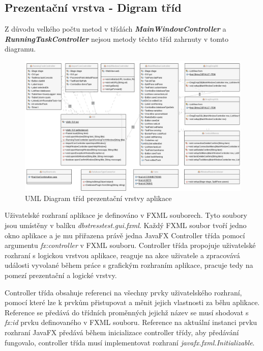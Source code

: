 \documentclass[czech,bachelor,public,dept460,male,cpdeclaration,twoside]{diploma}
\begin{document}
\newpage
\subsection{Prezentační vrstva - Digram tříd} \label{prezent}
Z důvodu velkého počtu metod v třídách \textbf{\emph{MainWindowController}} a \textbf{\emph{RunningTaskController}} nejsou metody těchto tříd zahrnuty v tomto diagramu.

\begin{figure}[!htbp]\centering\includegraphics[width=1.0\textwidth]{Figures/PresentLayerDiagram.png}\caption{UML Diagram tříd prezentační vrstvy aplikace}
\end{figure}

Uživatelské rozhraní aplikace je definováno v FXML souborech. Tyto soubory jsou umístěny v balíku \textit{dbstresstest.gui.fxml}. Každý FXML soubor tvoří jedno okno aplikace a je mu přiřazena právě jedna JavaFX Controller třída pomocí argumentu \textit{fx:controller} v FXML souboru. Controller třída propojuje uživatelské rozhraní s logickou vrstvou aplikace, reaguje na akce uživatele a zpracovává události vyvolané během práce s grafickým rozhraním aplikace, pracuje tedy na pomezí prezentační a logické vrstvy.

Controller třída obsahuje referenci na všechny prvky uživatelského rozhraní, pomocí které lze k prvkům přistupovat a měnit jejich vlastnosti za běhu aplikace. Reference se předává do třídních proměnných jejichž název se musí shodovat s \textit{fx:id} prvku definovaného v FXML souboru. Reference na aktuální instanci prvku rozhraní JavaFX předává během inicializace controller třídy, aby předávání fungovalo, controller třída musí implementovat rozhraní \textit{javafx.fxml.Initializable}.
\end{document}
